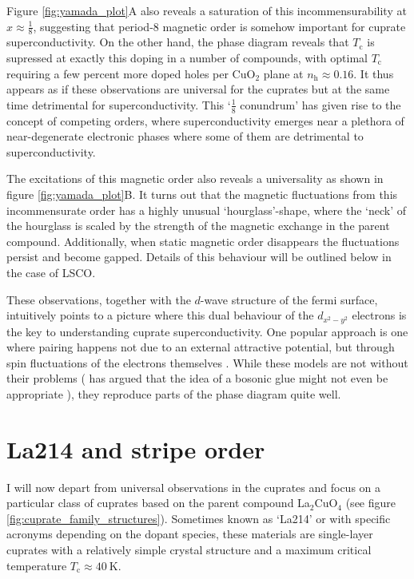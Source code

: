 Figure \ref{fig:yamada_plot}A also reveals a saturation of this incommensurability at $x \approx \frac{1}{8}$, suggesting that period-8 magnetic order is somehow important for cuprate superconductivity. On the other hand, the phase diagram reveals that $T_\text{c}$ is supressed at exactly this doping in a number of compounds, with optimal $T_\text{c}$ requiring a few percent more doped holes per CuO$_2$ plane at $n_\text{h} \approx 0.16$. It thus appears as if these observations are universal for the cuprates but at the same time detrimental for superconductivity. This `$\frac{1}{8}$ conundrum' has given rise to the concept of competing orders, where superconductivity emerges near a plethora of near-degenerate electronic phases where some of them are detrimental to superconductivity.

The excitations of this magnetic order also reveals a universality as shown in figure \ref{fig:yamada_plot}B. It turns out that the magnetic fluctuations from this incommensurate order has a highly unusual `hourglass'-shape, where the `neck' of the hourglass is scaled by the strength of the magnetic exchange in the parent compound. Additionally, when static magnetic order disappears the fluctuations persist and become gapped. Details of this behaviour will be outlined below in the case of LSCO.

These observations, together with the $d$-wave structure of the fermi surface, intuitively points to a picture where this dual behaviour of the $d_{x^2-y^2}$ electrons is the key to understanding cuprate superconductivity. One popular approach is one where pairing happens not due to an external attractive potential, but through spin fluctuations of the electrons themselves \cite{Scalapino2012}. While these models are not without their problems (\citeauthor{Anderson2007} has argued that the idea of a bosonic glue might not even be appropriate \cite{Anderson2007}), they reproduce parts of the phase diagram quite well.

\section{La214 and stripe order}\label{sec:lsco}
I will now depart from universal observations in the cuprates and focus on a particular class of cuprates based on the parent compound La$_2$CuO$_4$ (see figure \ref{fig:cuprate_family_structures}). Sometimes known as `La214' or with specific acronyms depending on the dopant species, these materials are single-layer cuprates with a relatively simple crystal structure and a maximum critical temperature $T_\text{c} \approx \SI{40}{\kelvin}$.

